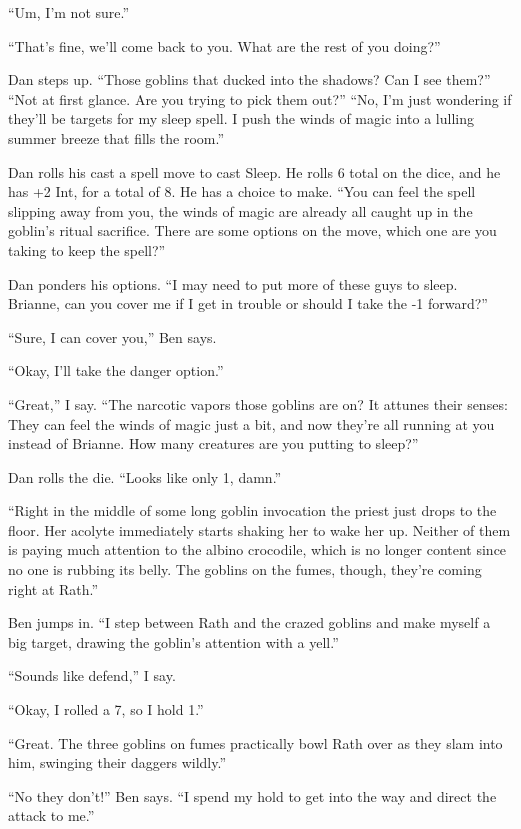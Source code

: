 ``Um, I'm not sure.''

``That's fine, we'll come back to you. What are the rest of you doing?''

Dan steps up. ``Those goblins that ducked into the shadows? Can I see them?'' ``Not at first glance. Are you trying to pick them out?'' ``No, I'm just wondering if they'll be targets for my sleep spell. I push the winds of magic into a lulling summer breeze that fills the room.''

Dan rolls his cast a spell move to cast Sleep. He rolls 6 total on the dice, and he has +2 Int, for a total of 8. He has a choice to make. ``You can feel the spell slipping away from you, the winds of magic are already all caught up in the goblin's ritual sacrifice. There are some options on the move, which one are you taking to keep the spell?''

Dan ponders his options. ``I may need to put more of these guys to sleep. Brianne, can you cover me if I get in trouble or should I take the -1 forward?''

``Sure, I can cover you,'' Ben says.

``Okay, I'll take the danger option.''

``Great,'' I say. ``The narcotic vapors those goblins are on? It attunes their senses: They can feel the winds of magic just a bit, and now they're all running at you instead of Brianne. How many creatures are you putting to sleep?''

Dan rolls the die. ``Looks like only 1, damn.''

``Right in the middle of some long goblin invocation the priest just drops to the floor. Her acolyte immediately starts shaking her to wake her up. Neither of them is paying much attention to the albino crocodile, which is no longer content since no one is rubbing its belly. The goblins on the fumes, though, they're coming right at Rath.''

Ben jumps in. ``I step between Rath and the crazed goblins and make myself a big target, drawing the goblin's attention with a yell.''

``Sounds like defend,'' I say.

``Okay, I rolled a 7, so I hold 1.''

``Great. The three goblins on fumes practically bowl Rath over as they slam into him, swinging their daggers wildly.''

``No they don't!'' Ben says. ``I spend my hold to get into the way and direct the attack to me.''

